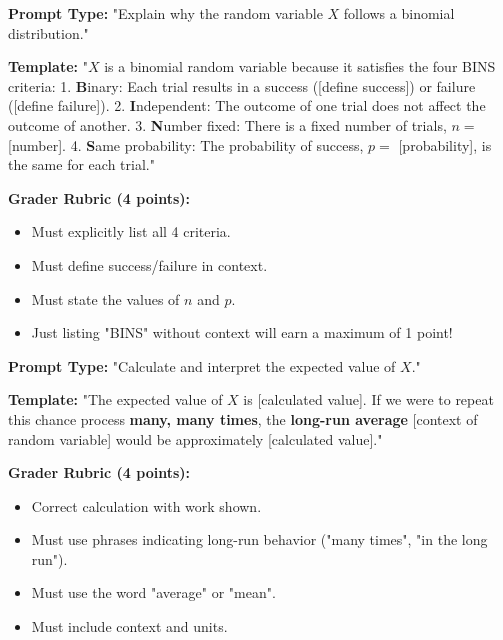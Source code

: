 \begin{frqrubricbox}
\textbf{Prompt Type:} "Explain why the random variable $X$ follows a binomial distribution."

\textbf{Template:}
"$X$ is a binomial random variable because it satisfies the four BINS criteria:
1. \textbf{B}inary: Each trial results in a success ([define success]) or failure ([define failure]).
2. \textbf{I}ndependent: The outcome of one trial does not affect the outcome of another.
3. \textbf{N}umber fixed: There is a fixed number of trials, $n = $ [number].
4. \textbf{S}ame probability: The probability of success, $p = $ [probability], is the same for each trial."

\textbf{Grader Rubric (4 points):}
\begin{itemize}
    \item Must explicitly list all 4 criteria.
    \item Must define success/failure in context.
    \item Must state the values of $n$ and $p$.
    \item Just listing "BINS" without context will earn a maximum of 1 point!
\end{itemize}
\end{frqrubricbox}

\begin{frqrubricbox}
\textbf{Prompt Type:} "Calculate and interpret the expected value of $X$."

\textbf{Template:}
"The expected value of $X$ is [calculated value]. If we were to repeat this chance process \textbf{many, many times}, the \textbf{long-run average} [context of random variable] would be approximately [calculated value]."

\textbf{Grader Rubric (4 points):}
\begin{itemize}
    \item Correct calculation with work shown.
    \item Must use phrases indicating long-run behavior ("many times", "in the long run").
    \item Must use the word "average" or "mean".
    \item Must include context and units.
\end{itemize}
\end{frqrubricbox}

